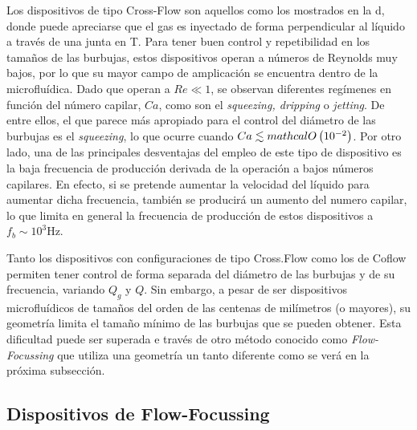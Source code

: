 Los dispositivos de tipo Cross-Flow son aquellos como los mostrados en la d, donde puede apreciarse que el gas es inyectado de forma perpendicular al líquido a través de una junta en T. Para tener buen control y repetibilidad en los tamaños de las burbujas, estos dispositivos operan a números de Reynolds muy bajos, por lo que su mayor campo de amplicación se encuentra dentro de la microfluídica. Dado que operan a $Re \ll 1$, se observan diferentes regímenes en función del número capilar, $Ca$, como son el \emph{squeezing, dripping} o \emph{jetting}. De entre ellos, el que parece más apropiado para el control del diámetro de las burbujas es el \emph{squeezing}, lo que ocurre cuando $Ca \lesssim \\mathcal{O}\left(10^{-2}\right)$. Por otro lado, una de las principales desventajas del empleo de este tipo de dispositivo es la baja frecuencia de producción derivada de la operación a bajos números capilares. En efecto, si se pretende aumentar la velocidad del líquido para aumentar dicha frecuencia, también se producirá un aumento del numero capilar, lo que limita en general la frecuencia de producción de estos dispositivos a $f_{b}\sim 10^{3} \mathrm{Hz}$. 

Tanto los dispositivos con configuraciones de tipo Cross.Flow como los de Coflow permiten tener control de forma separada del diámetro de las burbujas y de su frecuencia, variando $Q_{g}$ y $Q$. Sin embargo, a pesar de ser dispositivos microfluídicos de tamaños del orden de las centenas de milímetros (o mayores), su geometría limita el tamaño mínimo de las burbujas que se pueden obtener. Esta dificultad puede ser superada e través de otro método conocido como \emph{Flow-Focussing} que utiliza una geometría un tanto diferente como se verá en la próxima subsección. 

\subsection{Dispositivos de Flow-Focussing}


